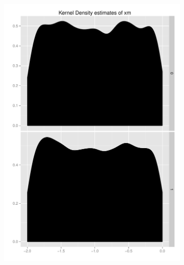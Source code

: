 \documentclass[11pt,letterpaper]{article}
\begin{document}
\begin{landscape}
\begin{figure}[h]
    \begin{subfigure}[b]{0.3\textwidth}\centering \includegraphics[width=1\textwidth]{xm} \end{subfigure}

\end{figure}
\end{landscape}
\end{document}
